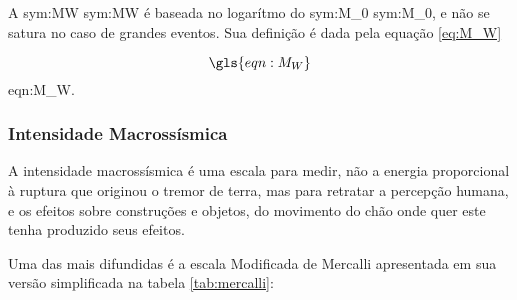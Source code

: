 A \glsdesc{sym:MW} \gls{sym:MW} \citep{hanks_1979} é baseada no 
logarítmo do \glsdesc{sym:M_0} \gls{sym:M_0}, e não se satura no caso de grandes eventos. 
Sua definição é dada pela equação \eqref{eq:M_W} 

\begin{equation}
	\gls{eqn:M_W}
	\label{eq:M_W}
\end{equation}
\glsdesc*{eqn:M_W}.


\subsubsection{Intensidade Macrossísmica}
\label{sec:intensidade}

A intensidade macrossísmica é uma escala para medir, não a energia proporcional
à ruptura que originou o tremor de terra, mas para retratar a percepção humana, e os efeitos sobre
construções e objetos, do movimento do chão onde quer este tenha produzido seus efeitos.

Uma das mais difundidas é a escala Modificada de Mercalli \citep{richter_1958} apresentada em sua versão simplificada 
na tabela \ref{tab:mercalli}:

